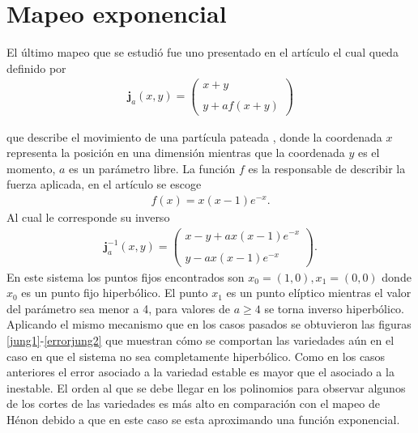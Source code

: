 \section{Mapeo exponencial}
El último mapeo que se estudió fue uno presentado en el artículo \citep{Jung} el cual queda definido por 
\begin{eqnarray}
\mathbf{j}_{a}(x,y)=\left(\begin{array}{lcc}
             x+y\\
             \\ y+af(x+y)
             \end{array}\right)
\label{Jung}
\end{eqnarray}

que describe el movimiento de una partícula pateada , donde la coordenada $x$ representa la posición en una dimensión mientras que la coordenada $y$ es el momento, $a$ es un parámetro libre. La función $f$ es la responsable de describir la fuerza aplicada, en el artículo \cite{Jung} se escoge
\begin{eqnarray*}
f(x)=x(x-1)e^{-x}.
\end{eqnarray*}
Al cual le corresponde su inverso
\begin{eqnarray}
\mathbf{j}^{-1}_{a}(x,y)=\left(\begin{array}{lcc}
             x-y+ax(x-1)e^{-x}\\
             \\ y-ax(x-1)e^{-x}
             \end{array}\right).
             \label{jungI}
\end{eqnarray}
En este sistema los puntos fijos encontrados son $x_{0}=(1,0),x_{1}=(0,0)$ donde $x_{0}$ es un punto fijo hiperbólico. El punto $x_{1}$ es un punto elíptico mientras el valor del parámetro sea menor a 4, para valores de $a \geq 4$ se torna inverso hiperbólico.\\

Aplicando el mismo mecanismo que en los casos pasados se obtuvieron las figuras \ref{jung1}-\ref{errorjung2} que muestran cómo se comportan las variedades aún en el caso en que el sistema no sea completamente hiperbólico. Como en los casos anteriores el error asociado a la variedad estable es mayor que el asociado a la inestable. El orden al que se debe llegar en los polinomios para observar algunos de los cortes de las variedades es más alto en comparación con el mapeo de Hénon debido a que en este caso se esta aproximando una función exponencial.

